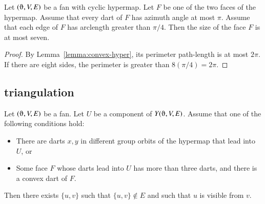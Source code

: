 \begin{lemma}
Let $(\orgn,V,E)$ be a fan with cyclic hypermap.
Let $F$ be one of the two faces of the
hypermap.  Assume that every dart of $F$ has azimuth angle at
most $\pi$.  Assume that each edge of $F$ has arclength 
greater than $\pi/4$.
Then the size of the face $F$ is at most seven.
\end{lemma}

\begin{proof} By Lemma~\ref{lemma:convex-hyper},
 its perimeter path-length is at
most $2\pi$.  If there are eight sides, the perimeter
is greater than $8 (\pi/4) =2\pi$.
\end{proof}




\subsection{triangulation}




\begin{lemma}
 Let $(\orgn,V,E)$ be a fan.  Let $U$ be a component of $Y(\orgn,V,E)$.
Assume that one of the following conditions hold:
\begin{itemize} 
  \item There are darts $x,y$ in different group orbits  of the 
   hypermap that lead into $U$, or
  \item Some face $F$ whose darts lead into $U$ 
has more than three darts, and there is a convex dart of $F$.
\end{itemize}
Then there exists $\{u,v\}$ such that $\{u,v\}\not\in E$ and such
that $u$ is visible from $v$.
\end{lemma}

